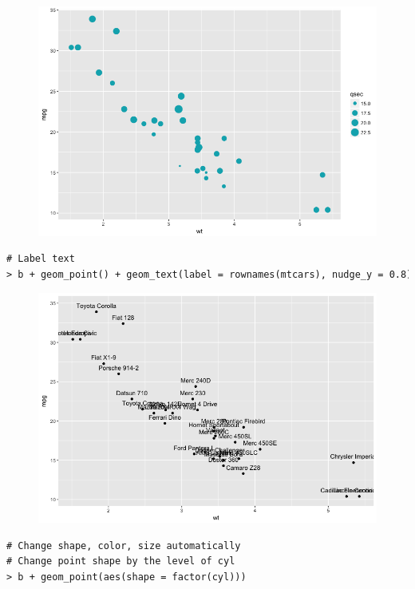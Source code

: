 \begin{figure}[H]\begin{center}\includegraphics[scale=1 ]{ilu/bg37.png}\end{center}\end{figure}
\begin{lstlisting}[language=html]
# Label text
> b + geom_point() + geom_text(label = rownames(mtcars), nudge_y = 0.8)
\end{lstlisting}
\begin{figure}[H]\begin{center}\includegraphics[scale=1 ]{ilu/bg38.png}\end{center}\end{figure}
\begin{lstlisting}[language=html]
# Change shape, color, size automatically
# Change point shape by the level of cyl
> b + geom_point(aes(shape = factor(cyl)))
\end{lstlisting}

